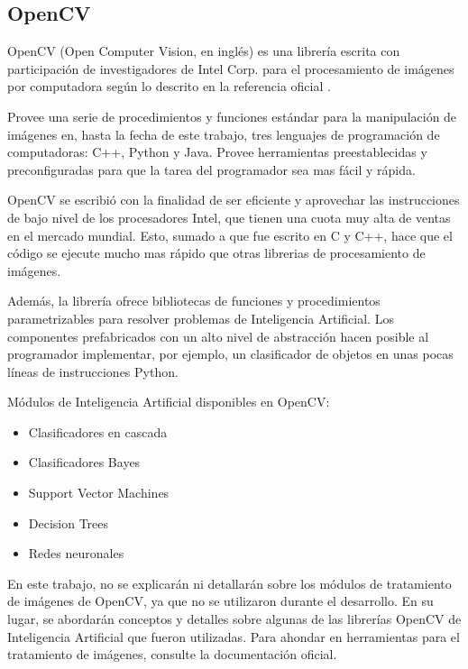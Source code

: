 \documentclass[a4paper,12pt,oneside,spanish]{book}
\begin{document}
\subsection{OpenCV}

OpenCV (Open Computer Vision, en inglés) es una librería escrita con participación de investigadores de Intel Corp. para el procesamiento de imágenes por computadora según lo descrito en la referencia oficial \cite{opencv1}. \par 
Provee una serie de procedimientos y funciones estándar para la manipulación de imágenes en, hasta la fecha de este trabajo, tres lenguajes de programación de computadoras: C++,  Python y Java. Provee herramientas preestablecidas y preconfiguradas para que la tarea del programador sea mas fácil y rápida. \par

OpenCV se escribió con la finalidad de ser eficiente y aprovechar las instrucciones de bajo nivel de los procesadores Intel, que tienen una cuota muy alta de ventas en el mercado mundial. Esto, sumado a que fue escrito en C y C++, hace que el código se ejecute mucho mas rápido que otras librerias de procesamiento de imágenes.\par

Además, la librería ofrece bibliotecas de funciones y procedimientos parametrizables para resolver problemas de Inteligencia Artificial. Los componentes prefabricados con un alto nivel de abstracción hacen posible al programador implementar, por ejemplo, un clasificador de objetos en unas pocas líneas de instrucciones Python.\par

Módulos de Inteligencia Artificial disponibles en OpenCV:
\begin{itemize}
	\item Clasificadores en cascada	
	\item Clasificadores Bayes
	\item Support Vector Machines
	\item Decision Trees 
	\item Redes neuronales 
\end{itemize}

En este trabajo, no se explicarán ni detallarán sobre los módulos de tratamiento de imágenes de OpenCV, ya que no se utilizaron durante el desarrollo. En su lugar, se abordarán conceptos y detalles sobre algunas de las librerías OpenCV de Inteligencia Artificial que fueron utilizadas. Para ahondar en herramientas para el tratamiento de imágenes, consulte la documentación oficial.\par
\end{document}
